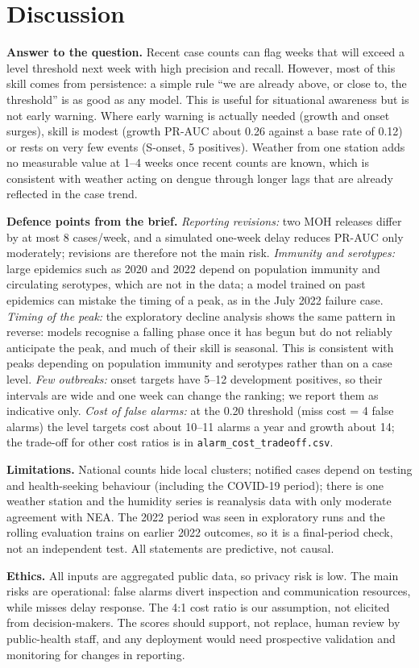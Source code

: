 \section{Discussion}
\label{sec:discussion}
\textbf{Answer to the question.} Recent case counts can flag weeks that will exceed a level
threshold next week with high precision and recall. However, most of this skill comes from
persistence: a simple rule ``we are already above, or close to, the threshold'' is as good as
any model. This is useful for situational awareness but is not early warning. Where early
warning is actually needed (growth and onset surges), skill is modest (growth PR-AUC about
0.26 against a base rate of 0.12) or rests on very few events (S-onset, 5 positives). Weather
from one station adds no measurable value at 1--4 weeks once recent counts are known, which is
consistent with weather acting on dengue through longer lags that are already reflected in the
case trend.

\textbf{Defence points from the brief.}
\emph{Reporting revisions:} two MOH releases differ by at most 8 cases/week, and a simulated
one-week delay reduces PR-AUC only moderately; revisions are therefore not the main risk.
\emph{Immunity and serotypes:} large epidemics such as 2020 and 2022 depend on population
immunity and circulating serotypes, which are not in the data; a model trained on past
epidemics can mistake the timing of a peak, as in the July 2022 failure case.
\emph{Timing of the peak:} the exploratory decline analysis shows the same pattern in reverse:
models recognise a falling phase once it has begun but do not reliably anticipate the peak, and
much of their skill is seasonal. This is consistent with peaks depending on population immunity
and serotypes rather than on a case level.
\emph{Few outbreaks:} onset targets have 5--12 development positives, so their intervals are
wide and one week can change the ranking; we report them as indicative only.
\emph{Cost of false alarms:} at the 0.20 threshold (miss cost = 4 false alarms) the level
targets cost about 10--11 alarms a year and growth about 14; the trade-off for other cost
ratios is in \texttt{alarm\_cost\_tradeoff.csv}.

\textbf{Limitations.} National counts hide local clusters; notified cases depend on testing
and health-seeking behaviour (including the COVID-19 period); there is one weather station and
the humidity series is reanalysis data with only moderate agreement with NEA. The 2022 period
was seen in exploratory runs and the rolling evaluation trains on earlier 2022 outcomes, so
it is a final-period check, not an independent test. All statements are predictive, not
causal.

\textbf{Ethics.} All inputs are aggregated public data, so privacy risk is low. The main risks
are operational: false alarms divert inspection and communication resources, while misses
delay response. The 4:1 cost ratio is our assumption, not elicited from decision-makers. The
scores should support, not replace, human review by public-health staff, and any deployment
would need prospective validation and monitoring for changes in reporting.
